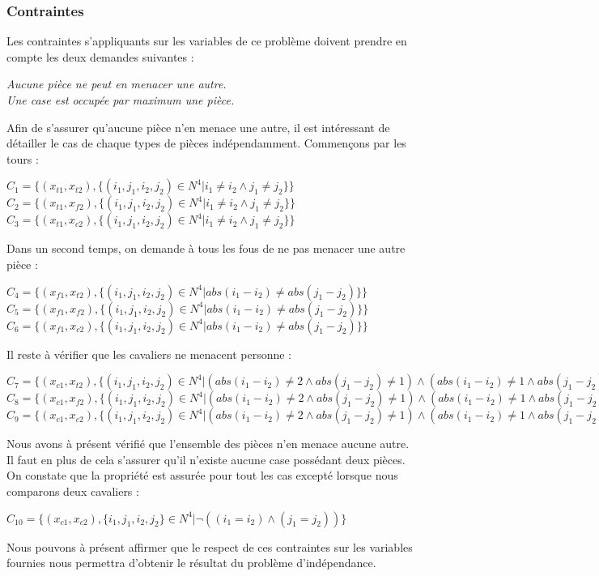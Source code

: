 \documentclass[a4paper]{article}
\begin{document}
\subsubsection{Contraintes}
Les contraintes s'appliquants sur les variables de ce problème doivent prendre en compte les deux demandes suivantes : 
\begin{center}
\textit{Aucune pièce ne peut en menacer une autre.} \vspace{0.1cm} \\
\textit{Une case est occupée par maximum une pièce.}
\end{center}
Afin de s'assurer qu'aucune pièce n'en menace une autre, il est intéressant de détailler le cas de chaque types de pièces indépendamment. Commençons par les tours : 
\begin{center}
$C_1 = \{ (x_{t1},x_{t2}), \{(i_1,j_1,i_2,j_2) \in N^4 | i_1 \neq i_2 \wedge j_1 \neq j_2\} \}$
$C_2 = \{ (x_{t1},x_{f2}), \{(i_1,j_1,i_2,j_2) \in N^4 | i_1 \neq i_2 \wedge j_1 \neq j_2\} \}$
$C_3 = \{ (x_{t1},x_{c2}), \{(i_1,j_1,i_2,j_2) \in N^4 | i_1 \neq i_2 \wedge j_1 \neq j_2\} \}$
\end{center}
Dans un second temps, on demande à tous les fous de ne pas menacer une autre pièce : 
\begin{center}
$C_4 = \{ (x_{f1},x_{t2}), \{(i_1,j_1,i_2,j_2) \in N^4 | abs(i_1 - i_2) \neq abs(j_1 - j_2) \} \}$
$C_5 = \{ (x_{f1},x_{f2}), \{(i_1,j_1,i_2,j_2) \in N^4 | abs(i_1 - i_2) \neq abs(j_1 - j_2) \} \}$
$C_6 = \{ (x_{f1},x_{c2}), \{(i_1,j_1,i_2,j_2) \in N^4 | abs(i_1 - i_2) \neq abs(j_1 - j_2) \} \}$
\end{center}
Il reste à vérifier que les cavaliers ne menacent personne : 
\begin{center}
$C_7 = \{ (x_{c1},x_{t2}), \{(i_1,j_1,i_2,j_2) \in N^4 | (abs(i_1 - i_2) \neq 2 \wedge abs(j_1 - j_2) \neq 1) \wedge (abs(i_1 - i_2) \neq 1 \wedge abs(j_1 - j_2) \neq 2)\} $ \\
$C_8 = \{ (x_{c1},x_{f2}), \{(i_1,j_1,i_2,j_2) \in N^4 | (abs(i_1 - i_2) \neq 2 \wedge abs(j_1 - j_2) \neq 1) \wedge (abs(i_1 - i_2) \neq 1 \wedge abs(j_1 - j_2) \neq 2)\} $ \\
$C_9 = \{ (x_{c1},x_{c2}), \{(i_1,j_1,i_2,j_2) \in N^4 | (abs(i_1 - i_2) \neq 2 \wedge abs(j_1 - j_2) \neq 1) \wedge (abs(i_1 - i_2) \neq 1 \wedge abs(j_1 - j_2)) \neq 2\} $
\end{center}
Nous avons à présent vérifié que l'ensemble des pièces n'en menace aucune autre. Il faut en plus de cela s'assurer qu'il n'existe aucune case possédant deux pièces. On constate que la propriété est assurée pour tout les cas excepté lorsque nous comparons deux cavaliers : 
\begin{center}
$ C_{10} = \{ (x_{c1},x_{c2}), \{ i_1,j_1,i_2,j_2 \} \in N^4 | \neg((i_1 = i_2) \wedge (j_1 = j_2)) \}$
\end{center}
Nous pouvons à présent affirmer que le respect de ces contraintes sur les variables fournies nous permettra d'obtenir le résultat du problème d'indépendance. 
\end{document}
